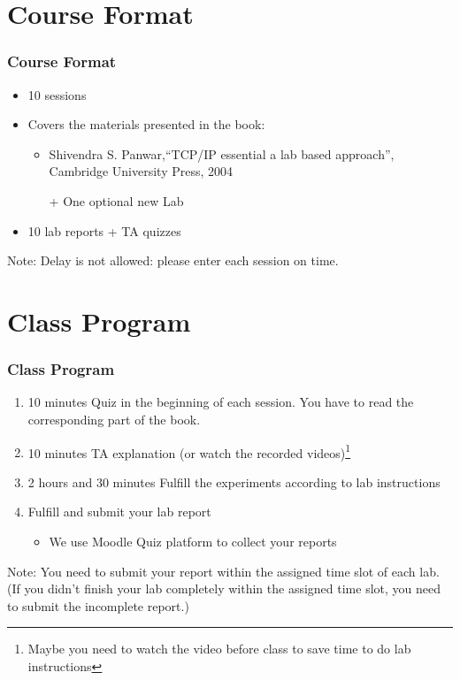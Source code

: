 \documentclass[aspectratio=169,15pt]{beamer}
\begin{document}
\section{Course Format}
\begin{frame}
    \frametitle{Course Format}

    \begin{itemize}
        \item 10 sessions
        \item Covers the materials presented in the book:
              \begin{itemize}
                  \item Shivendra S. Panwar,“TCP/IP essential a lab based approach”, Cambridge University Press, 2004
                  \item[+] One optional new Lab
              \end{itemize}
        \item 10 lab reports + TA quizzes
    \end{itemize}
    \begin{alertblock}{Note:}
        Delay is not allowed: please enter each session on time.
    \end{alertblock}

\end{frame}

\section{Class Program}
\begin{frame}
    \frametitle{Class Program}

    \begin{enumerate}
        \item \alert{10 minutes} Quiz in the beginning of each session. You have to read the corresponding part of the book.
        \item \alert{10 minutes} TA explanation (or watch the recorded videos)\footnote{Maybe you need to watch the video before class to save time to do lab instructions}
        \item \alert{2 hours and 30 minutes} Fulfill the experiments according to lab instructions
        \item Fulfill and submit your lab report
              \begin{itemize}
                  \item We use Moodle Quiz platform to collect your reports
              \end{itemize}
    \end{enumerate}
    \begin{alertblock}{Note:}
        You need to submit your report  within the assigned time slot of each lab.
        (If you didn’t finish your lab completely within the assigned time slot, you need to submit the incomplete report.)
    \end{alertblock}

\end{frame}
\end{document}
